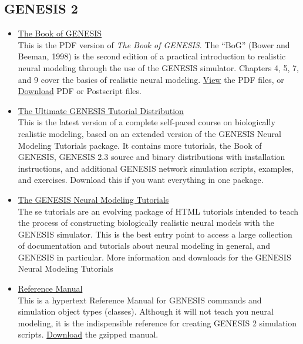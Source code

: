 \documentclass[12pt]{article}
\begin{document}
\subsection*{GENESIS 2}

\begin{itemize}
 
 \item \href{http://www.genesis-sim.org/GENESIS/bog/bog.html}{The Book of GENESIS}\\
 This is the PDF version of {\it The Book of GENESIS}. The ``BoG'' (Bower and Beeman, 1998) is the second edition of a practical introduction to realistic neural modeling through the use of the GENESIS simulator. Chapters 4, 5, 7, and 9 cover the basics of realistic neural modeling.  \href{http://www.genesis-sim.org/GENESIS/iBoG/iBoGpdf/index.html}{View} the PDF files, or \href{http://www.genesis-sim.org/GENESIS/iBoG/index.html}{Download} PDF or Postscript files.

\item \href{http://www.genesis-sim.org/GENESIS/UGTD.html}{The Ultimate GENESIS Tutorial Distribution}\\
This is the latest version of a complete self-paced course on biologically realistic modeling, based on an extended version of the GENESIS Neural Modeling Tutorials package. It contains more tutorials, the Book of GENESIS, GENESIS 2.3 source and binary distributions with installation instructions, and additional GENESIS network simulation scripts, examples, and exercises. Download this if you want everything in one package.

\item \href{http://www.genesis-sim.org/GENESIS/GNMT.html}{The GENESIS Neural Modeling Tutorials}\\
The se tutorials are an evolving package of HTML tutorials intended to teach the process of constructing biologically realistic neural models with the GENESIS simulator. This is the best entry point to access a large collection of documentation and tutorials about neural modeling in general, and GENESIS in particular. More information and downloads for the GENESIS Neural Modeling Tutorials

 \item \href{http://www.genesis-sim.org/GENESIS/Hyperdoc/Manual.html}{Reference Manual}\\
This is a hypertext Reference Manual for GENESIS commands and simulation object types (classes). Although it will not teach you neural modeling, it is the indispensible reference for creating GENESIS 2 simulation scripts. \href{http://www.genesis-sim.org/genesis-ftp/}{Download} the gzipped manual.


\end{itemize}
\end{document}
